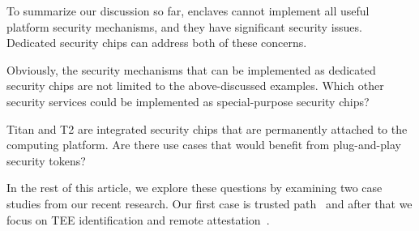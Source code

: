 To summarize our discussion so far, enclaves cannot implement all useful platform security mechanisms, and they have significant security issues. Dedicated security chips can address both of these concerns. 

Obviously, the security mechanisms that can be implemented as dedicated security chips are not limited to the above-discussed examples. Which other security services could be implemented as special-purpose security chips? 

Titan and T2 are integrated security chips that are permanently attached to the computing platform. Are there use cases that would benefit from plug-and-play security tokens?

In the rest of this article, we explore these questions by examining two case studies from our recent research. Our first case is trusted path~\cite{protection} and after that we focus on TEE identification and remote attestation~\cite{proximitee}.
